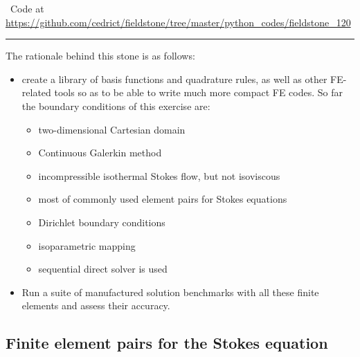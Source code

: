 %

\begin{center}
\inpython~Code at \url{https://github.com/cedrict/fieldstone/tree/master/python_codes/fieldstone_120}
\end{center}

\par\noindent\rule{\textwidth}{0.4pt}


The rationale behind this stone is as follows:
\begin{itemize}
\item create a library of basis functions and quadrature rules, as well as 
other FE-related tools so as to be able to write much more compact FE codes. 
So far the boundary conditions of this exercise are:
\begin{itemize}
\item two-dimensional Cartesian domain
\item Continuous Galerkin method
\item incompressible isothermal Stokes flow, but not isoviscous
\item most of commonly used element pairs for Stokes equations 
\item Dirichlet boundary conditions 
\item isoparametric mapping
\item sequential direct solver is used
\end{itemize}
\item Run a suite of manufactured solution benchmarks with all 
these finite elements and assess their accuracy.
\end{itemize}


\subsection*{Finite element pairs for the Stokes equation}

